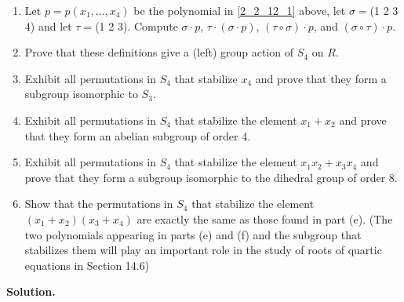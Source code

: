 \begin{enumerate}
                  \begin{enumerate}
                     \item Let $p = p(x_1, \ldots, x_4)$ be the polynomial in
                           \eqref{2_2_12_1} above, let $\sigma =$(1 2 3 4) and
                           let $\tau = $(1 2 3). Compute $\sigma \cdot p$,
                           $\tau \cdot (\sigma \cdot p)$,
                           $(\tau \circ \sigma) \cdot p$, and
                           $(\sigma \circ \tau) \cdot p$.
                     \item Prove that these definitions give a (left) group
                           action of $S_4$ on $R$.
                     \item Exhibit all permutations in $S_4$ that stabilize
                           $x_4$ and prove that they form a subgroup isomorphic
                           to $S_3$.
                     \item Exhibit all permutations in $S_4$ that stabilize the
                           element $x_1 + x_2$ and prove that they form an
                           abelian subgroup of order 4.
                     \item Exhibit all permutations in $S_4$ that stabilize the
                           element $x_1x_2 + x_3x_4$ and prove that they form a
                           subgroup isomorphic to the dihedral group of order 8.
                     \item Show that the permutations in $S_4$ that stabilize
                           the element $(x_1 + x_2)(x_3 + x_4)$ are exactly the
                           same as those found in part (e). (The two polynomials
                           appearing in parts (e) and (f) and the subgroup that
                           stabilizes them will play an important role in the
                           study of roots of quartic equations in Section 14.6)
                  \end{enumerate}

      \textbf{Solution.}


\end{enumerate}
